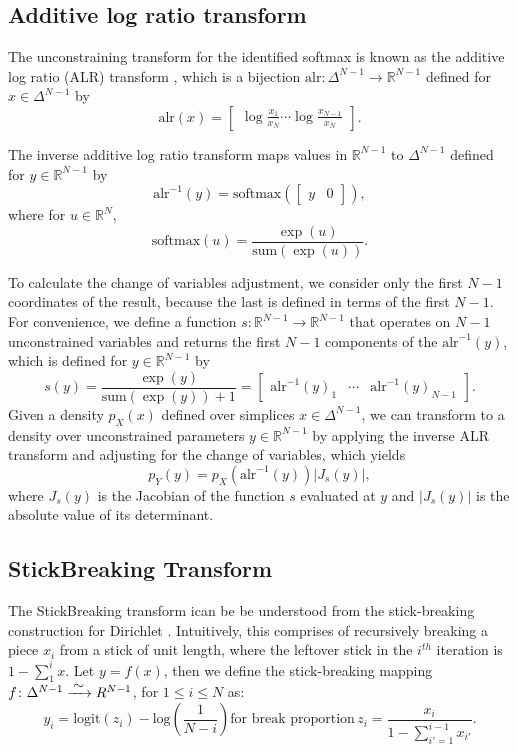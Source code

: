 \documentclass[11pt]{article}
\newcommand{\abs}[1]{\left| #1 \right|}
\newcommand{\absdet}[1]{\abs{#1}}
\begin{document}
\subsection{Additive log ratio transform}

The unconstraining transform for the identified softmax is known as
the additive log ratio (ALR) transform
\cite{aitchison1982statistical}, which is a bijection
$\textrm{alr}:\Delta^{N-1} \rightarrow \mathbb{R}^{N-1}$ defined for
$x \in \Delta^{N-1}$ by
\[
  \textrm{alr}(x)
  = \begin{bmatrix}\displaystyle
    \log \frac{x_1}{x_N} \cdots \log \frac{x_{N-1}}{x_N}
  \end{bmatrix}.
\]

The inverse additive log ratio transform maps values in
$\mathbb{R}^{N-1}$ to $\Delta^{N-1}$ defined for $y \in
\mathbb{R}^{N-1}$ by
\[
  \textrm{alr}^{-1}(y)
  = \textrm{softmax}(\begin{bmatrix} y &  0 \end{bmatrix}),
\]
where for $u \in \mathbb{R}^N$,
\[
  \textrm{softmax}(u) = \frac{\exp(u)}{\textrm{sum}(\exp(u))}.
\]

To calculate the change of variables adjustment, we consider only the
first $N-1$ coordinates of the result, because the last is defined in
terms of the first $N-1$.  For convenience, we define a function 
$s:\mathbb{R}^{N-1} \rightarrow \mathbb{R}^{N-1}$ that operates on
$N-1$ unconstrained variables and returns the first $N-1$ components
of the $\textrm{alr}^{-1}(y)$, which is
defined for $y \in \mathbb{R}^{N-1}$ by
\[
  s(y) = \frac{\exp(y)}{\textrm{sum}(\exp(y)) + 1}
  = \begin{bmatrix}
    \textrm{alr}^{-1}(y)_1
    & \cdots &
    \textrm{alr}^{-1}(y)_{N-1}
    \end{bmatrix}.
\]
Given a density $p_X(x)$ defined over simplices $x \in \Delta^{N-1}$,
we can transform to a density over unconstrained parameters $y \in
\mathbb{R}^{N-1}$ by applying the inverse ALR transform and adjusting
for the change of variables, which yields
\[
  p_Y(y) = p_X(\textrm{alr}^{-1}(y)) \absdet{J_{s}(y)},
\]
where $J_{s}(y)$ is the Jacobian of the function $s$ evaluated at $y$
and $\absdet{J_s(y)}$ is the absolute value of its determinant.

\subsection{StickBreaking Transform}

The StickBreaking transform ican be be understood from the stick-breaking construction for Dirichlet \cite{sethurman}. Intuitively, this comprises of recursively breaking a piece $x_i$ from a stick of unit length, where the leftover stick in the $i^{th}$ iteration is $ 1 - \sum_{1}^{i}x$. Let $y = f(x)$, then we define the stick-breaking mapping $ f \colon \Delta^{N-1} \xrightarrow{\makebox[0.4cm]{$\sim$}}  R^{N-1}$, for $1 \leq i \leq N$ as:	
\[
y_i
= \mathrm{logit}(z_i) - \mbox{log}\left(\frac{1}{N-i}
   \right) \text{for break proportion} \, 
   z_i = \frac{x_i}{1 - \sum_{i' = 1}^{i-1} x_{i'}}.
\]
\end{document}
